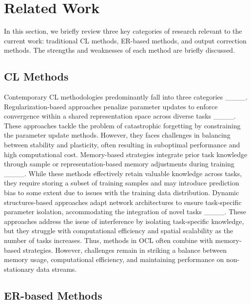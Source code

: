 \section{Related Work}
In this section, we briefly review three key categories of research relevant to the current work: traditional CL methods, ER-based methods, and output correction methods. The strengths and weaknesses of each method are briefly discussed.
\subsection{CL Methods}

Contemporary CL methodologies predominantly fall into three categories ____. Regularization-based approaches penalize parameter updates to enforce convergence within a shared representation space across diverse tasks ____. These approaches tackle the problem of catastrophic forgetting by constraining the parameter update methods. However, they faces challenges in balancing between stability and plasticity, often resulting in suboptimal performance and high computational cost. Memory-based strategies integrate prior task knowledge through sample or representation-based memory adjustments during training ____. While these methods effectively retain valuable knowledge across tasks, they require storing a subset of training samples and may introduce prediction bias to some extent due to issues with the training data distribution. Dynamic structures-based approaches adapt network architectures to ensure task-specific parameter isolation, accommodating the integration of novel tasks ____.  These approaches address the issue of interference by isolating task-specific knowledge, but they struggle with computational efficiency and spatial scalability as the number of tasks increases. Thus, methods in OCL often combine with memory-based strategies. However, challenges remain in striking a balance between memory usage, computational efficiency, and maintaining performance on non-stationary data streams.


\subsection{ER-based Methods}

